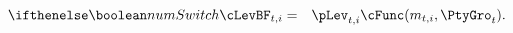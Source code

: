 \begin{eqnarray}
  \label{eq:cFlevel}
\ifnumSw  \cLevBF_{t,i} & = & \pLev_{t,i} \cFunc(m_{t,i},\PtyGro_t)  \nonumber
.
\end{eqnarray}
